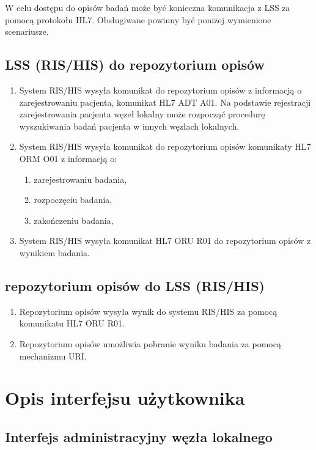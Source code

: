 \documentclass[a4paper]{report}
\begin{document}
W celu dostępu do opisów badań może być konieczna komunikacja z LSS za pomocą protokołu HL7. Obsługiwane powinny być poniżej wymienione scenariusze.

\subsection{LSS (RIS/HIS) do repozytorium opisów}

\begin{enumerate}
  \item System RIS/HIS wysyła komunikat do repozytorium opisów z informacją o zarejestrowaniu pacjenta, komunikat HL7 ADT A01. Na podstawie rejestracji zarejestrowania pacjenta węzeł lokalny może rozpocząć procedurę wyszukiwania badań pacjenta w innych węzłach lokalnych.
  \item System RIS/HIS wysyła komunikat do repozytorium opisów komunikaty HL7 ORM O01 z informacją o:
    \begin{enumerate}
      \item zarejestrowaniu badania,
      \item rozpoczęciu badania,
      \item zakończeniu badania,
    \end{enumerate}
  \item System RIS/HIS wysyła komunikat HL7 ORU R01 do repozytorium opisów z wynikiem badania.
\end{enumerate}

\subsection{repozytorium opisów do LSS (RIS/HIS)}

\begin{enumerate}
  \item Repozytorium opisów wysyła wynik do systemu RIS/HIS za pomocą komunikatu HL7 ORU R01.
  \item Repozytorium opisów umożliwia pobranie wyniku badania za pomocą mechanizmu URI.
\end{enumerate}


\section{Opis interfejsu użytkownika}

\subsection{Interfejs administracyjny węzła lokalnego}
\end{document}
